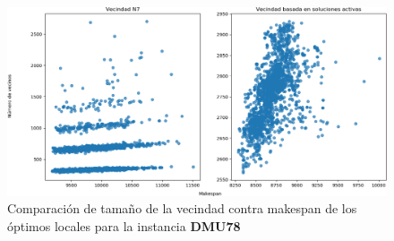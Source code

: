 \begin{figure}[H]
    \includegraphics[scale=.6]{Imagenes/compvec78.png}
    \caption{Comparación de tamaño de la vecindad contra makespan de los óptimos locales para la instancia \textbf{DMU78} }
    \label{fig:mattgraph}
\end{figure}

